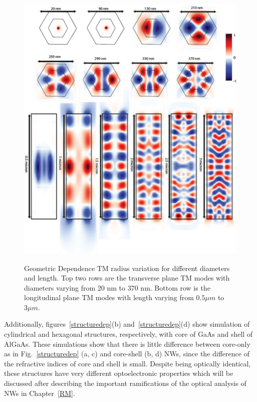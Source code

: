 \begin{figure}
  \caption{Geometric Dependence TM radius variation for different diameters and length. Top two rows are the transverse plane TM modes with diameters varying from 20 nm to 370 nm. Bottom row is the longitudinal plane TM modes with length varying from $0.5 \mu{m}$ to $3 \mu{m}$.}
  \centering
  \includegraphics[width=\textwidth]{pictures/LM/TMRadius}
  \label{TMRadius}
\end{figure}

Additionally, figures~\ref{structuredep}(b) and~\ref{structuredep}(d) show
simulation of cylindrical and hexagonal structures, respectively, with core of
GaAs and shell of AlGaAs. These simulations show that there is little
difference between core-only as in Fig.~\ref{structuredep} (a, c) and
core-shell (b, d) NWs, since the difference of the refractive indices of core
and shell is small. Despite being optically identical, these structures have
very different optoelectronic properties which will be discussed after
describing the important ramifications of the optical analysis of NWs in
Chapter~\ref{RM}.

